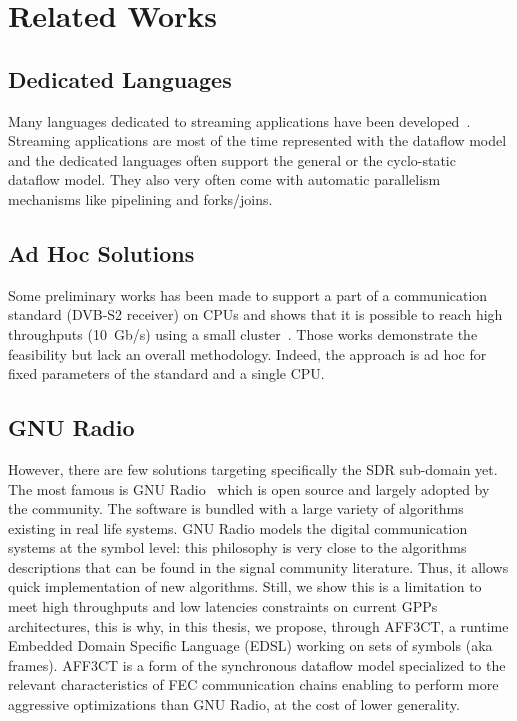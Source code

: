 \section{Related Works}

\subsection{Dedicated Languages}

Many languages dedicated to streaming applications have been
developed~\cite{Buck2004,Amarasinghe2005,Liao2006,Black-Schaffer2010,Glitia2010,
Thies2010,DeOliveiraCastro2017}. Streaming applications are most of the time
represented with the dataflow model and the dedicated languages often support
the general or the cyclo-static dataflow model. They also very often come with
automatic parallelism mechanisms like pipelining and forks/joins.

\subsection{Ad Hoc Solutions}

Some preliminary works has been made to support a part of a communication
standard (DVB-S2 receiver) on CPUs and shows that it is possible to reach high
throughputs (10~Gb/s) using a small cluster~\cite{Grayver2020}. Those works
demonstrate the feasibility but lack an overall methodology. Indeed, the
approach is ad hoc for fixed parameters of the standard and a single CPU.

\subsection{GNU Radio}

However, there are few solutions targeting specifically the SDR sub-domain yet.
The most famous is GNU Radio~\cite{GNURadio} which is open source and largely
adopted by the community. The software is bundled with a large variety of
algorithms existing in real life systems. GNU Radio models the digital
communication systems at the symbol level: this philosophy is very close to the
algorithms descriptions that can be found in the signal community literature.
Thus, it allows quick implementation of new algorithms. Still, we show this is a
limitation to meet high throughputs and low latencies constraints on current
GPPs architectures, this is why, in this thesis, we propose, through AFF3CT, a
runtime Embedded Domain Specific Language (EDSL) working on sets of symbols
(aka frames). AFF3CT is a form of the synchronous dataflow model specialized to
the relevant characteristics of FEC communication chains enabling to perform
more aggressive optimizations than GNU Radio, at the cost of lower generality.

